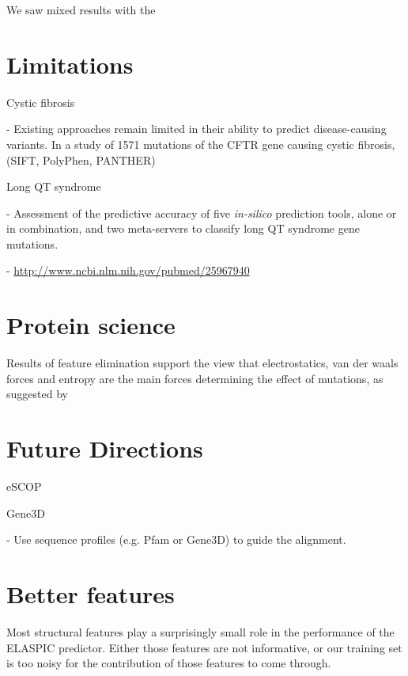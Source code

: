 
 \label{chap:discussion}

We saw mixed results with the

\section{Limitations}

Cystic fibrosis

  - Existing approaches remain limited in their ability to predict disease-causing variants. In a study of 1571 mutations of the CFTR gene causing cystic fibrosis, (SIFT, PolyPhen, PANTHER) \cite{dorfman_common_2010}

Long QT syndrome

  - Assessment of the predictive accuracy of five \textit{in-silico} prediction tools, alone or in combination, and two meta-servers to classify long QT syndrome gene mutations.

  - \url{http://www.ncbi.nlm.nih.gov/pubmed/25967940}


\section{Protein science}

Results of feature elimination support the view that electrostatics, van der waals forces and entropy are the main forces determining the effect of mutations, as suggested by


\section{Future Directions}


eSCOP

Gene3D

- Use sequence profiles (e.g. Pfam or Gene3D) to guide the alignment.


\section{Better features}

Most structural features play a surprisingly small role in the performance of the ELASPIC predictor. Either those features are not informative, or our training set is too noisy for the contribution of those features to come through.



